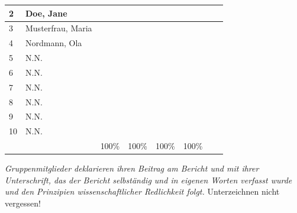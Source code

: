 \begin{titlepage}
\begin{table}[h]
\begin{tabular}{|l|l|l|l|l|l|l|l|}
2  & Doe, Jane         &            &                 &                   &                &                               &             \\ \hline
3  & Musterfrau, Maria &            &                 &                   &                &                               &             \\ \hline
4  & Nordmann, Ola     &            &                 &                   &                &                               &             \\ \hline 
5  & N.N.              &            &                 &                   &                &                               &             \\ \hline
6  & N.N.              &            &                 &                   &                &                               &             \\ \hline
7  & N.N.              &            &                 &                   &                &                               &             \\ \hline
8  & N.N.              &            &                 &                   &                &                               &             \\ \hline
9  & N.N.              &            &                 &                   &                &                               &             \\ \hline
10 & N.N.              &            &                 &                   &                &                               &             \\ \hline
   &                   & 100\%      & 100\%           & 100\%             & 100\%          &                               &            \\ \hline
\end{tabular}
\end{table}
\vfill
	{\large {\itshape Gruppenmitglieder deklarieren ihren Beitrag am Bericht und mit ihrer Unterschrift, das der Bericht selbständig und in eigenen Worten verfasst wurde und den Prinzipien wissenschaftlicher Redlichkeit folgt.} \Large{Unterzeichnen nicht vergessen!} \par}
\end{titlepage}

